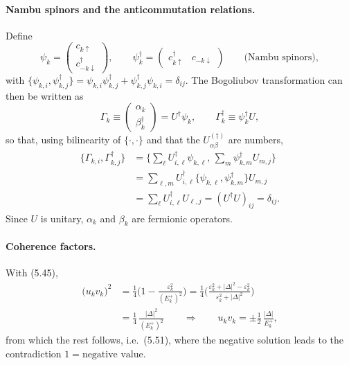 \documentclass[../../main.tex]{subfiles}
\begin{document}
\paragraph{Nambu spinors and the anticommutation relations.}
Define
\begin{equation}
\psi_k=\begin{pmatrix}c_{k\uparrow}\\c^\dagger_{-k\downarrow}\end{pmatrix},\qquad
\psi^\dagger_k=\begin{pmatrix}c^\dagger_{k\uparrow}&c_{-k\downarrow}\end{pmatrix}
\qquad\text{(Nambu spinors)},
\end{equation}
with $\{\psi_{k,i},\psi^\dagger_{k,j}\}
=\psi_{k,i}\psi^\dagger_{k,j}+\psi^\dagger_{k,j}\psi_{k,i}=\delta_{ij}$.
The Bogoliubov transformation can then be written as
\begin{equation}
\Gamma_k\equiv\begin{pmatrix}\alpha_k\\\beta^\dagger_k\end{pmatrix}=U^\dagger\psi_k,
\qquad
\Gamma^\dagger_k\equiv\psi^\dagger_k U ,
\end{equation}
so that, using bilinearity of $\{\cdot,\cdot\}$ and that the $U^{(\dagger)}_{\alpha\beta}$
are numbers,
\begin{align}
\{\Gamma_{k,i},\Gamma^\dagger_{k,j}\}
&=\Big\{\sum_\ell U^\dagger_{i,\ell}\psi_{k,\ell},\,
 \sum_m\psi^\dagger_{k,m}U_{m,j}\Big\}\\
&=\sum_{\ell,m}U^\dagger_{i,\ell}\{\psi_{k,\ell},\psi^\dagger_{k,m}\}U_{m,j}\\
&=\sum_\ell U^\dagger_{i,\ell}U_{\ell,j}=(U^\dagger U)_{ij}=\delta_{ij}.
\end{align}
Since $U$ is unitary, $\alpha_k$ and $\beta_k$ are fermionic operators.

\paragraph{Coherence factors.}
With (5.45),
\begin{align}
\big(u_kv_k\big)^2
&=\frac{1}{4}\Big(1-\frac{\varepsilon_k^2}{(E_k^+)^2}\Big)
 =\frac{1}{4}\Big(\frac{\varepsilon_k^2+|\Delta|^2-\varepsilon_k^2}
 {\varepsilon_k^2+|\Delta|^2}\Big)\\
&=\frac{1}{4}\,\frac{|\Delta|^2}{(E_k^+)^2}
 \qquad\Longrightarrow\qquad
 u_kv_k=\pm\frac{1}{2}\,\frac{|\Delta|}{E_k^+},
\end{align}
from which the rest follows, i.e.\ (5.51), where the negative solution leads to the
contradiction $1=\text{negative value}$.
\end{document}
